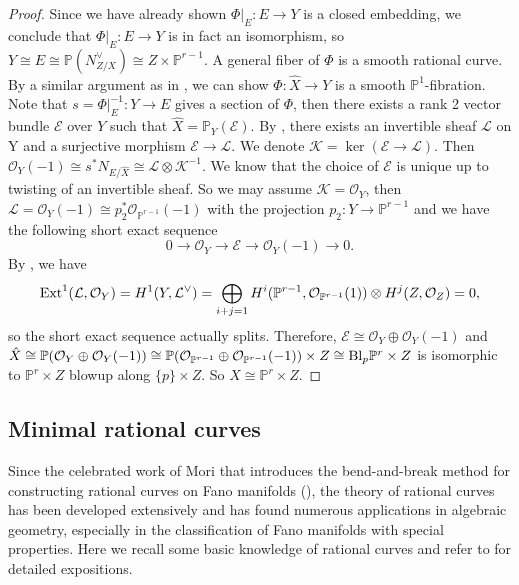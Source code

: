 \documentclass[12pt]{amsart}
\theoremstyle{definition}
\def\bl{{\rm Bl}}
\def\ext{{\rm Ext}}
\newcommand{\IP}{{\mathbb P}}
\newcommand{\CE}{{\mathcal E}}
\newcommand{\CK}{{\mathcal K}}
\newcommand{\CL}{{\mathcal L}}
\newcommand{\CO}{{\mathcal O}}
\begin{document}
\begin{proof}
    Since we have already shown $\Phi|_E\colon E\rightarrow Y$ is a closed embedding, we conclude that $\Phi|_E\colon E\rightarrow Y$ is in fact an isomorphism, so $ Y\cong E \cong \IP(N_{Z/X}^{\vee})\cong Z\times \IP^{r-1}$. A general fiber of $\Phi$ is a smooth rational curve. By a similar argument as in \cite[Lemma 6]{LZ18}, we can show $\Phi\colon \hat{X}\rightarrow Y$ is a smooth $\IP^1$-fibration. Note that $s=\Phi|_E^{-1}\colon Y\rightarrow E$ gives a section of $\Phi$, then there exists a rank 2 vector bundle $\CE$ over $Y$ such that $\hat{X} = \IP_Y(\CE)$. By \cite[Proposition V.2.6]{Har77}, there exists an invertible sheaf $\CL$ on Y and a surjective morphism $\CE \rightarrow \CL$. We denote $\CK = \ker(\CE \rightarrow \CL)$. Then $\CO_{Y}(-1)\cong s^*N_{E/\hat{X}}\cong \CL \otimes \CK^{-1}$. We know that the choice of $\CE$ is unique up to twisting of an invertible sheaf. So we may assume $\CK = \CO_Y$, then $\CL = \CO_{Y}(-1)\cong p_2^* \CO_{\IP^{r-1}}(-1)$ with the projection $p_2\colon Y\rightarrow\IP^{r-1}$ and we have the following short exact sequence
    $$
0\rightarrow \CO_{Y}\rightarrow \CE\rightarrow \CO_Y(-1)\rightarrow 0.
$$
By \cite[Prop III.6.3]{Har77}, we have 
\begin{eqnarray*}
    \ext^1(\CL,\CO_Y) = H^1(Y,\CL^{\vee})
    =\bigoplus_{i+j=1}H^i(\IP^{r-1},\CO_{\IP^{r-1}}(1))\otimes H^j(Z,\CO_Z)=0,
\end{eqnarray*}
so the short exact sequence actually splits. Therefore, $\CE \cong \CO_Y \oplus \CO_Y(-1)$ and $\hat{X}\cong \IP(\CO_Y\oplus \CO_{Y}(-1))\cong \IP(\CO_{\IP^{r-1}}\oplus\CO_{\IP^{r-1}}(-1))\times Z\cong \bl_{p}\IP^r\times Z$ is isomorphic to $\IP^r\times Z$ blowup along $\{p\}\times Z$. So $X\cong  \IP^r \times Z$.
\end{proof}

\subsection{Minimal rational curves}

Since the celebrated work of Mori that introduces the bend-and-break method for constructing rational curves on Fano manifolds (\cite{Mor79}), the theory of rational curves has been developed extensively and has found numerous applications in algebraic geometry, especially in the classification of Fano manifolds with special properties. Here we recall some basic knowledge of rational curves and refer to \cite{Kol96} for detailed expositions. 
\end{document}
